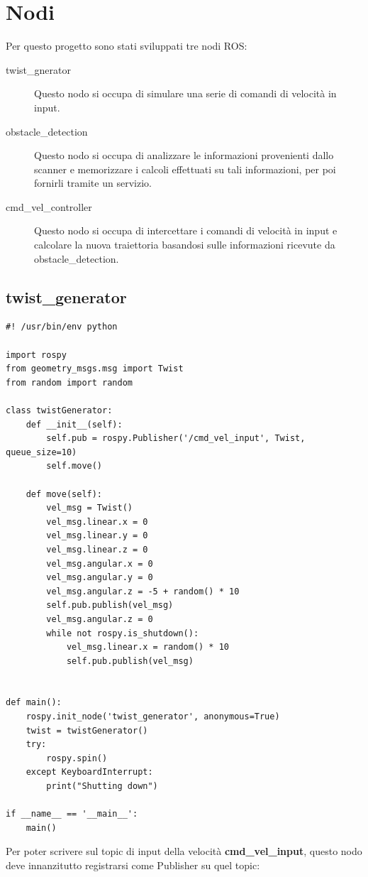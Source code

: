 \documentclass[Lau, binding=0.6cm, oneside]{sapthesis}
\begin{document}
\section{Nodi}
Per questo progetto sono stati sviluppati tre nodi ROS:
\begin{description}
	\item[twist\_gnerator] Questo nodo si occupa di simulare una serie di comandi di velocità in input.
	\item[obstacle\_detection] Questo nodo si occupa di analizzare le informazioni provenienti dallo scanner e memorizzare i calcoli effettuati su tali informazioni, per poi fornirli tramite un servizio.
	\item[cmd\_vel\_controller] Questo nodo si occupa di intercettare i comandi di velocità in input e calcolare la nuova traiettoria basandosi sulle informazioni ricevute da obstacle\_detection.
\end{description}

\subsection{twist\_generator}
\begin{lstlisting}
#! /usr/bin/env python

import rospy
from geometry_msgs.msg import Twist
from random import random

class twistGenerator:
    def __init__(self):
        self.pub = rospy.Publisher('/cmd_vel_input', Twist, queue_size=10)
        self.move()
    
    def move(self):
        vel_msg = Twist()
        vel_msg.linear.x = 0
        vel_msg.linear.y = 0
        vel_msg.linear.z = 0
        vel_msg.angular.x = 0
        vel_msg.angular.y = 0
        vel_msg.angular.z = -5 + random() * 10
        self.pub.publish(vel_msg)
        vel_msg.angular.z = 0
        while not rospy.is_shutdown():
            vel_msg.linear.x = random() * 10
            self.pub.publish(vel_msg)


def main():
    rospy.init_node('twist_generator', anonymous=True)
    twist = twistGenerator()
    try:
        rospy.spin()
    except KeyboardInterrupt:
        print("Shutting down")

if __name__ == '__main__':
    main()
\end{lstlisting}

Per poter scrivere sul topic di input della velocità \textbf{cmd\_vel\_input}, questo nodo deve innanzitutto registrarsi come Publisher su quel topic:
\end{document}

